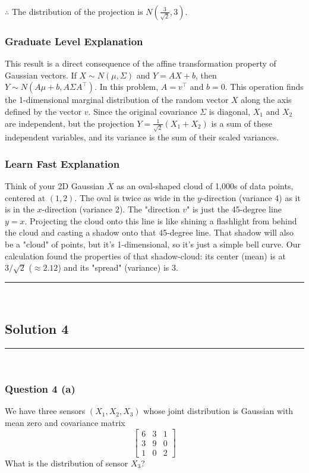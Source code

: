\documentclass{article}
\begin{document}
\subsubsection*{\normalfont}{$\therefore$ The distribution of the projection is $N\left(\frac{3}{\sqrt{2}}, 3\right)$.}
\subsubsection*{Graduate Level Explanation}
This result is a direct consequence of the affine transformation property of Gaussian vectors. If $X \sim N(\mu, \Sigma)$ and $Y = AX + b$, then $Y \sim N(A\mu + b, A\Sigma A^\top)$. In this problem, $A = v^\top$ and $b = 0$. This operation finds the 1-dimensional marginal distribution of the random vector $X$ along the axis defined by the vector $v$. Since the original covariance $\Sigma$ is diagonal, $X_1$ and $X_2$ are independent, but the projection $Y = \frac{1}{\sqrt{2}}(X_1 + X_2)$ is a sum of these independent variables, and its variance is the sum of their scaled variances.

\subsubsection*{Learn Fast Explanation}
Think of your 2D Gaussian $X$ as an oval-shaped cloud of 1,000s of data points, centered at $(1, 2)$. The oval is twice as wide in the $y$-direction (variance 4) as it is in the $x$-direction (variance 2). The "direction $v$" is just the 45-degree line $y=x$. Projecting the cloud onto this line is like shining a flashlight from behind the cloud and casting a shadow onto that 45-degree line. That shadow will also be a "cloud" of points, but it's 1-dimensional, so it's just a simple bell curve. Our calculation found the properties of that shadow-cloud: its center (mean) is at $3/\sqrt{2}$ ($\approx 2.12$) and its "spread" (variance) is $3$.

\noindent\rule{\textwidth}{0.4pt}\\

\subsection*{Solution 4}
\noindent\rule{\textwidth}{0.4pt}\\
\subsubsection*{Question 4 (a)}
\begin{flushleft}
    We have three sensors $(X_1, X_2, X_3)$ whose joint distribution is Gaussian with mean zero and covariance matrix 
    \[
    \begin{bmatrix}
    6 & 3 & 1 \\
    3 & 9 & 0 \\
    1 & 0 & 2
    \end{bmatrix}
    \]
    What is the distribution of sensor $X_3$? 
\end{flushleft}
\end{document}
